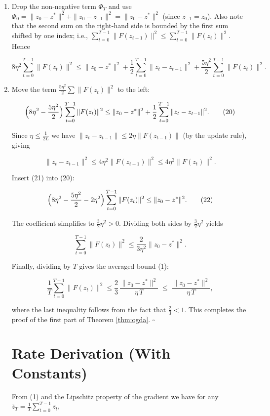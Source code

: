 \documentclass{article}
\begin{document}
\begin{enumerate}
\item[Step 14.] Drop the non‑negative term \(\Phi_{T}\) and use \(\Phi_{0}= \|z_{0}-z^{*}\|^{2}+\|z_{0}-z_{-1}\|^{2}= \|z_{0}-z^{*}\|^{2}\) (since \(z_{-1}=z_{0}\)). Also note that the second sum on the right-hand side is bounded by the first sum shifted by one index; i.e., \(\sum_{t=0}^{T-1}\|F(z_{t-1})\|^{2}\le \sum_{t=0}^{T-1}\|F(z_{t})\|^{2}\). Hence

\[
8\eta^{2}\sum_{t=0}^{T-1}\|F(z_{t})\|^{2}
\le \|z_{0}-z^{*}\|^{2}
+\frac{1}{2}\sum_{t=0}^{T-1}\|z_{t}-z_{t-1}\|^{2}
+\frac{5\eta^{2}}{2}\sum_{t=0}^{T-1}\|F(z_{t})\|^{2}.
\tag{19}
\]

\item[Step 15.] Move the term \(\frac{5\eta^{2}}{2}\sum\|F(z_{t})\|^{2}\) to the left:

\[
\Bigl(8\eta^{2}-\frac{5\eta^{2}}{2}\Bigr)\sum_{t=0}^{T-1}\|F(z_{t})\|^{2}
\le \|z_{0}-z^{*}\|^{2}
+\frac{1}{2}\sum_{t=0}^{T-1}\|z_{t}-z_{t-1}\|^{2}.
\tag{20}
\]

Since \(\eta\le \frac{1}{2L}\) we have \(\|z_{t}-z_{t-1}\|\le 2\eta\|F(z_{t-1})\|\) (by the update rule), giving  

\[
\|z_{t}-z_{t-1}\|^{2}\le 4\eta^{2}\|F(z_{t-1})\|^{2}\le 4\eta^{2}\|F(z_{t})\|^{2}.
\tag{21}
\]

Insert (21) into (20):

\[
\Bigl(8\eta^{2}-\frac{5\eta^{2}}{2}-2\eta^{2}\Bigr)\sum_{t=0}^{T-1}\|F(z_{t})\|^{2}
\le \|z_{0}-z^{*}\|^{2}.
\tag{22}
\]

The coefficient simplifies to \(\frac{3}{2}\eta^{2}>0\). Dividing both sides by \(\frac{3}{2}\eta^{2}\) yields

\[
\sum_{t=0}^{T-1}\|F(z_{t})\|^{2}
\le \frac{2}{3\eta^{2}}\|z_{0}-z^{*}\|^{2}.
\tag{23}
\]

Finally, dividing by \(T\) gives the averaged bound (1):

\[
\frac{1}{T}\sum_{t=0}^{T-1}\|F(z_{t})\|^{2}
\le \frac{2}{3}\,\frac{\|z_{0}-z^{*}\|^{2}}{\eta\,T}
\;\le\; \frac{\|z_{0}-z^{*}\|^{2}}{\eta\,T},
\]

where the last inequality follows from the fact that \(\frac{2}{3}<1\). This completes the proof of the first part of Theorem \ref{thm:ogda}. \(\square\)

\section*{Rate Derivation (With Constants)}
From (1) and the Lipschitz property of the gradient we have for any \(\bar z_{T}=\frac{1}{T}\sum_{t=0}^{T-1}z_{t}\),


\end{enumerate}
\end{document}
